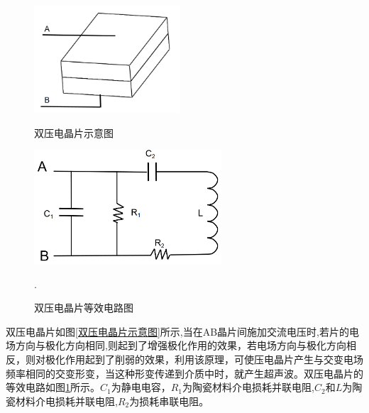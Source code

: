     \begin{figure}[!h]

    	\begin{minipage}{0.5\textwidth}
    		\centering
    		\includegraphics[height=4cm]{figure/双压电晶片示意图.png}
    		\caption{双压电晶片示意图}
    		\label{双压电晶片示意图}
    	\end{minipage}
    \begin{minipage}{0.5\textwidth}
    	\centering
    	\includegraphics[height=4.25cm]{figure/双压电晶片等效电路.png}
    	\caption{双压电晶片等效电路图}
    	\label{双压电晶片等效电路图}.
    \end{minipage}
    \end{figure}

    双压电晶片如图\ref{双压电晶片示意图}所示,当在AB晶片间施加交流电压时,若片的电场方向与极化方向相同,则起到了增强极化作用的效果，若电场方向与极化方向相反，则对极化作用起到了削弱的效果，利用该原理，可使压电晶片产生与交变电场频率相同的交变形变，当这种形变传递到介质中时，就产生超声波。双压电晶片的等效电路如图\ref{双压电晶片等效电路图}所示。$C_1$为静电电容，$R_1$为陶瓷材料介电损耗并联电阻,$C_2$和$L$为陶瓷材料介电损耗并联电阻,$R_2$为损耗串联电阻。\par

